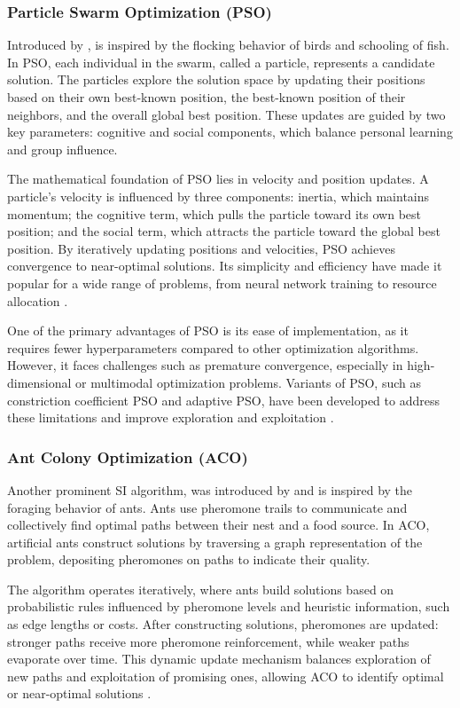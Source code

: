 \subsubsection*{Particle Swarm Optimization (PSO)} Introduced by \textcite{kennedy1995particle}, is inspired by the flocking behavior of birds and schooling of fish. In PSO, each individual in the swarm, called a particle, represents a candidate solution. The particles explore the solution space by updating their positions based on their own best-known position, the best-known position of their neighbors, and the overall global best position. These updates are guided by two key parameters: cognitive and social components, which balance personal learning and group influence.

The mathematical foundation of PSO lies in velocity and position updates. A particle's velocity is influenced by three components: inertia, which maintains momentum; the cognitive term, which pulls the particle toward its own best position; and the social term, which attracts the particle toward the global best position. By iteratively updating positions and velocities, PSO achieves convergence to near-optimal solutions. Its simplicity and efficiency have made it popular for a wide range of problems, from neural network training to resource allocation \parencite{clerc2002particle}.

One of the primary advantages of PSO is its ease of implementation, as it requires fewer hyperparameters compared to other optimization algorithms. However, it faces challenges such as premature convergence, especially in high-dimensional or multimodal optimization problems. Variants of PSO, such as constriction coefficient PSO and adaptive PSO, have been developed to address these limitations and improve exploration and exploitation \parencite{shi1998modified}.

\subsubsection*{Ant Colony Optimization (ACO)}
Another prominent SI algorithm, was introduced by \textcite{dorigo1996ant} and is inspired by the foraging behavior of ants. Ants use pheromone trails to communicate and collectively find optimal paths between their nest and a food source. In ACO, artificial ants construct solutions by traversing a graph representation of the problem, depositing pheromones on paths to indicate their quality.

The algorithm operates iteratively, where ants build solutions based on probabilistic rules influenced by pheromone levels and heuristic information, such as edge lengths or costs. After constructing solutions, pheromones are updated: stronger paths receive more pheromone reinforcement, while weaker paths evaporate over time. This dynamic update mechanism balances exploration of new paths and exploitation of promising ones, allowing ACO to identify optimal or near-optimal solutions \parencite{dorigo2007ant}.

